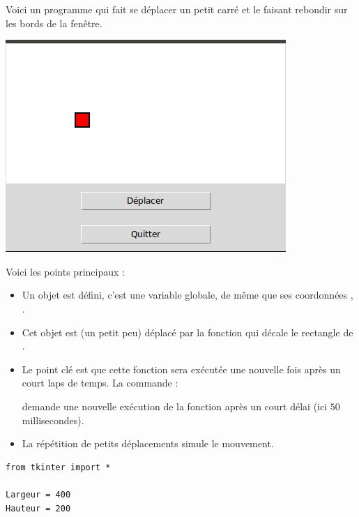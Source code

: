\documentclass[11pt,class=report,crop=false]{standalone}
\begin{document}
\begin{cours}


Voici un programme qui fait se déplacer un petit carré et le faisant rebondir sur les bords de la fenêtre.

\begin{center}
\includegraphics[scale=0.5]{ecran-alea-cours-mouv}
\end{center}

Voici les points principaux :
\begin{itemize}
  \item Un objet  est défini, c'est une variable globale, de même que ses coordonnées , .
  
  \item Cet objet est (un petit peu) déplacé par la fonction  qui décale le rectangle de .
    
  \item Le point clé est que cette fonction sera exécutée une nouvelle fois après un court laps de temps. La commande :\\
  \centerline{}
  demande une nouvelle exécution de la fonction  après un court délai (ici $50$ millisecondes).
  
  \item La répétition de petits déplacements simule le mouvement.
\end{itemize}

\begin{lstlisting}
from tkinter import *

Largeur = 400
Hauteur = 200


\end{lstlisting}
\end{cours}
\end{document}
